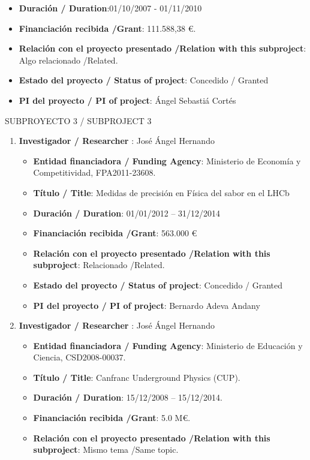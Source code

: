\begin{enumerate}
\begin{itemize}
\item {\bf Duración / Duration}:01/10/2007 - 01/11/2010 
\item {\bf Financiación recibida /Grant}: 111.588,38 \euro. 
\item {\bf Relación con el proyecto presentado /Relation with this subproject}: Algo relacionado /Related. 
\item {\bf Estado del proyecto / Status of project}: Concedido / Granted
\item {\bf PI del proyecto / PI of project}: Ángel Sebastiá Cortés 
\end{itemize}
\end{enumerate}


{\sc SUBPROYECTO 3 / SUBPROJECT 3}

\begin{enumerate}
\item {\bf Investigador / Researcher }: José Ángel Hernando
\begin{itemize}
\item {\bf Entidad financiadora / Funding Agency}: Ministerio de Econom\'ia y Competitividad, FPA2011-23608.  
\item {\bf Título / Title}:  Medidas de precisi\'on en F\'isica del sabor en el LHCb
\item {\bf Duración / Duration}: 01/01/2012 -- 31/12/2014
\item {\bf Financiación recibida /Grant}: 563.000 \euro 
\item {\bf Relación con el proyecto presentado /Relation with this subproject}: Relacionado /Related. 
\item {\bf Estado del proyecto / Status of project}: Concedido / Granted
\item {\bf PI del proyecto / PI of project}: Bernardo Adeva Andany
\end{itemize}
\item {\bf Investigador / Researcher }: José Ángel Hernando
\begin{itemize}
\item {\bf Entidad financiadora / Funding Agency}: Ministerio de Educaci\'on y Ciencia, CSD2008-00037.
\item {\bf Título / Title}:  Canfranc Underground Physics (CUP).
\item {\bf Duración / Duration}: 15/12/2008 -- 15/12/2014. 
\item {\bf Financiación recibida /Grant}: 5.0 M\euro. 
\item {\bf Relación con el proyecto presentado /Relation with this subproject}: Mismo tema /Same topic. 

\end{itemize}
\end{enumerate}
